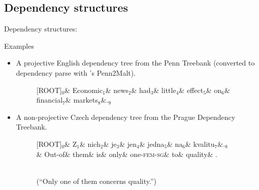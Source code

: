 \documentclass[10pt]{beamer}%
\theoremstyle{remark}
\begin{document}
\subsection{Dependency structures}
\begin{frame}

  Dependency structures:


  \begin{alertblock}{Examples}
    \begin{itemize}
      \item A projective English dependency tree from the Penn Treebank (converted to dependency parse with \citeauthor{nivre.j:2008}'s Penn2Malt).
        \begin{figure}[H]
          \begin{dependency}[label style={fill=bg}]
            \begin{deptext}
              {[ROOT]}$_0$\& Economic$_1$\& news$_2$\& had$_3$\& little$_4$\& effect$_5$\& on$_6$\& financial$_7$\& markets$_8$\&.$_9$\\
            \end{deptext}
          \end{dependency}
        \end{figure}

      \item A non-projective Czech dependency tree from the Prague Dependency Treebank.
        \begin{figure}[H]
          \begin{dependency}[label style={fill=bg}]
            \begin{deptext}
              {[ROOT]}$_0$\& Z$_1$\& nich$_2$\& je$_3$\& jen$_4$\& jedna$_5$\& na$_6$\& kvalitu$_7$\&.$_8$\\
              \& {\color{gray} Out-of}\& {\color{gray} them}\& {\color{gray} is}\& {\color{gray} only}\& {\color{gray} one-\textsc{fem-sg}}\& {\color{gray} to}\& {\color{gray} quality}\& {\color{gray}.}\\
            \end{deptext}
          \end{dependency}\\
          (``Only one of them concerns quality.'')
        \end{figure}
    \end{itemize}
  \end{alertblock}


\end{frame}
\end{document}
